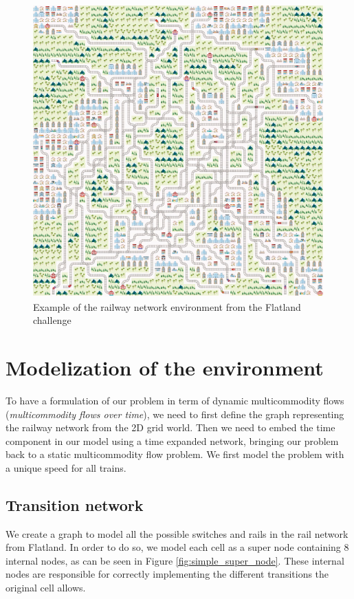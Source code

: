 \documentclass[14pt,a4paper]{article}
\theoremstyle{definition}
\numberwithin{equation}{subsection}
\begin{document}
\begin{figure}[H]
\centering
\includegraphics[scale=0.4]{img/flatland.png}
\caption{Example of the railway network environment from the Flatland challenge}
\end{figure}






\newpage
\section{Modelization of the environment}

To have a formulation of our problem in term of dynamic multicommodity flows (\emph{multicommodity flows over time}), we need to first define the graph representing the railway network from the 2D grid world. Then we need to embed the time component in our model using a time expanded network, bringing our problem back to a static multicommodity flow problem.
We first model the problem with a unique speed for all trains.

\subsection{Transition network}

We create a graph to model all the possible switches and rails in the rail network from Flatland. In order to do so, we model each cell as a super node containing 8 internal nodes, as can be seen in Figure \ref{fig:simple_super_node}. These internal nodes are responsible for correctly implementing the different transitions the original cell allows. 
\end{document}
